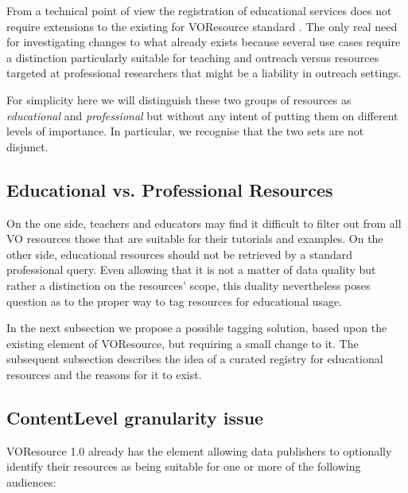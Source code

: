 \documentclass{ivoa}
\begin{document}
\label{sect:curreg}


From a technical point of view the registration of educational services
does not require extensions
to the existing for VOResource standard \citep{2008ivoa.spec.0222P}.
The only real need for investigating changes to what already exists
because several
use cases require a distinction particularly suitable for teaching and
outreach
versus resources targeted at professional researchers that might be a
liability in outreach settings.

For simplicity here we will distinguish these two groups of resources as
\emph{educational}
 and 
\emph{professional}
 but without any intent of putting them
on different levels of importance.  In particular, we recognise that the
two sets are not disjunct.



\subsection{Educational vs. Professional Resources}

\label{sect:eduvspro}


On the one side, teachers and educators may find it difficult to filter out 
from all VO resources those that are suitable for their tutorials and
examples. On the other side, educational resources should not be retrieved 
by a standard professional query.
Even allowing that it is not a matter of data quality but rather a distinction on 
the resources' scope, this duality nevertheless poses question as to the
proper way to tag resources for educational usage.
  


In the next subsection we propose a possible tagging solution, based upon 
the existing 
element of VOResource, but requiring a small change
to it. The subsequent subsection describes the idea of a
curated registry for educational resources and the reasons for it to exist.
  


\subsection{ContentLevel granularity issue}

\label{sect:contentlvl}

VOResource 1.0 already has the 
element
allowing data publishers to optionally identify their resources as being 
suitable for one or more of the following audiences:
\end{document}
